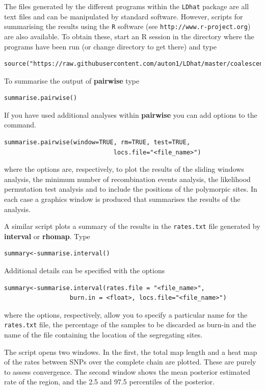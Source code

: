 \documentclass[a4paper,10pt,fullpage]{article}
\begin{document}
The files generated by the different programs within the \verb+LDhat+ package are all text files and can be manipulated by standard software.  However, scripts for summarising the results using the \verb+R+ software (see \verb+http://www.r-project.org+) are also available.  To obtain these, start an R session in the directory where the programs have been run (or change directory to get there) and type
\begin{verbatim}
source("https://raw.githubusercontent.com/auton1/LDhat/master/coalescent.r")
\end{verbatim}
To summarise the output of {\bf pairwise} type
\begin{verbatim}
summarise.pairwise()
\end{verbatim}
\noindent If you have used additional analyses within {\bf pairwise} you can add options to the command.
\begin{verbatim}
summarise.pairwise(window=TRUE, rm=TRUE, test=TRUE, 
                              locs.file="<file_name>")
\end{verbatim}
\noindent where the options are, respectively, to plot the results of the sliding windows analysis, the minimum number of recombination events analysis, the likelihood permutation test analysis and to include the positions of the polymorpic sites.  In each case a graphics window is produced that summarises the results of the analysis.

A similar script plots a summary of the results in the \verb+rates.txt+ file generated by {\bf interval} or {\bf rhomap}.  Type 
\begin{verbatim}
summary<-summarise.interval()
\end{verbatim}
\noindent Additional details can be specified with the options 
\begin{verbatim} 
summary<-summarise.interval(rates.file = "<file_name>", 
                  burn.in = <float>, locs.file="<file_name>")
\end{verbatim}


\noindent where the options, respectively, allow you to specify a particular name for the \verb+rates.txt+ file, the percentage of the samples to be discarded as burn-in and the name of the file containing the location of the segregating sites.

The script opens two windows.  In the first, the total map length and a heat map of the rates between SNPs over the complete chain are plotted.  These are purely to assess convergence.  The second window shows the mean posterior estimated rate of the region, and the 2.5 and 97.5 percentiles of the posterior.
\end{document}
